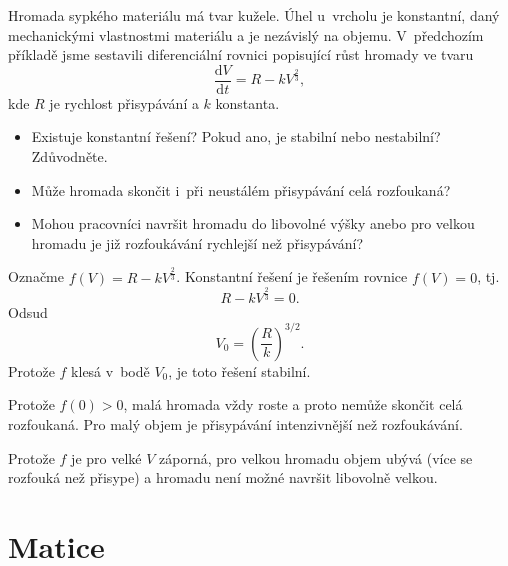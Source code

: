 Hromada sypkého materiálu má tvar kužele. Úhel u~vrcholu je konstantní, daný
mechanickými vlastnostmi materiálu a je nezávislý na
objemu. V předchozím příkladě jsme sestavili diferenciální rovnici popisující růst hromady ve tvaru
$$\frac{\mathrm dV}{\mathrm dt}=R-kV^{\frac 23},$$
kde $R$ je rychlost přisypávání a $k$ konstanta.
\vspace*{25pt}
\begin{itemize}
\item Existuje konstantní řešení? Pokud ano, je stabilní nebo nestabilní? Zdůvodněte.
\item Může hromada skončit i při neustálém přisypávání celá rozfoukaná?
\item Mohou pracovníci navršit hromadu do libovolné výšky anebo pro velkou hromadu je již rozfoukávání rychlejší než přisypávání?
\end{itemize}

\reseni
Označme $f(V)=R-kV^{\frac 23}$.
Konstantní řešení je řešením rovnice $f(V)=0$, tj. $$R-kV^{\frac 23}=0.$$ Odsud
$$V_0=\left(\frac{R}{k}\right)^{3/2}.$$ Protože $f$ klesá v bodě $V_0$, je toto řešení stabilní.

Protože $f(0)>0$, malá hromada vždy roste a proto nemůže skončit celá rozfoukaná. Pro malý objem je přisypávání intenzivnější než rozfoukávání.

Protože $f$ je pro velké $V$ záporná, pro velkou hromadu objem ubývá (více se rozfouká než přisype) a hromadu není možné navršit libovolně velkou. 

\konec



\stranka



\stranka
\section{Matice}

